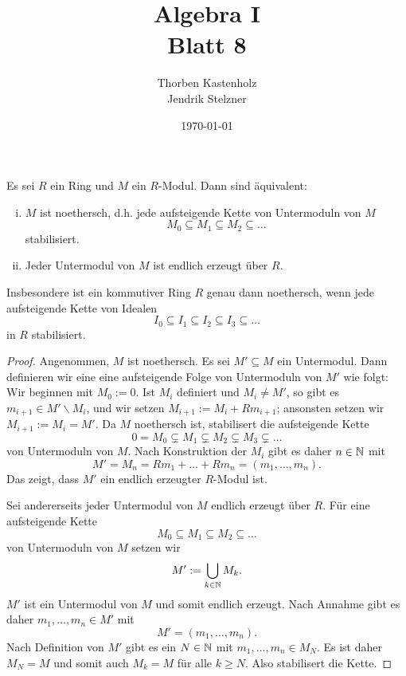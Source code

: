 \documentclass[a4paper,10pt]{article}
\title{\sc Algebra I \\ \Large Blatt 8}
\author{Thorben Kastenholz \\ Jendrik Stelzner}
\date{\today}
\begin{document}
\maketitle

\section{}

\begin{lem}\label{lem: Äquivalente Definitionen von noethersch}
 Es sei $R$ ein Ring und $M$ ein $R$-Modul. Dann sind äquivalent:
 \begin{enumerate}[i)]
  \item $M$ ist noethersch, d.h. jede aufsteigende Kette von Untermoduln von $M$
  \[
   M_0 \subseteq M_1 \subseteq M_2 \subseteq \ldots
  \]
  stabilisiert.
  \item Jeder Untermodul von $M$ ist endlich erzeugt über $R$.
 \end{enumerate}
 Insbesondere ist ein kommutiver Ring $R$ genau dann noethersch, wenn jede aufsteigende Kette von Idealen
 \[
  I_0 \subseteq I_1 \subseteq I_2 \subseteq I_3 \subseteq \ldots
 \]
 in $R$ stabilisiert.
\end{lem}
\begin{proof}
 Angenommen, $M$ ist noethersch. Es sei $M' \subseteq M$ ein Untermodul. Dann definieren wir eine eine aufsteigende Folge von Untermoduln von $M'$ wie folgt: Wir beginnen mit $M_0 := 0$. Ist $M_i$ definiert und $M_i \neq M'$, so gibt es $m_{i+1} \in M' \smallsetminus M_i$, und wir setzen $M_{i+1} := M_i + R m_{i+1}$; ansonsten setzen wir $M_{i+1} := M_i = M'$. Da $M$ noethersch ist, stabilisert die aufsteigende Kette
 \[
  0 = M_0 \subsetneq M_1 \subsetneq M_2 \subsetneq M_3 \subsetneq \ldots
 \]
 von Untermoduln von $M$. Nach Konstruktion der $M_i$ gibt es daher $n \in \mathbb{N}$ mit
 \[
  M' = M_n = Rm_1 + \ldots + Rm_n = (m_1, \ldots, m_n).
 \]
 Das zeigt, dass $M'$ ein endlich erzeugter $R$-Modul ist.
 
 Sei andererseits jeder Untermodul von $M$ endlich erzeugt über $R$. Für eine aufsteigende Kette
 \[
  M_0 \subseteq M_1 \subseteq M_2 \subseteq \ldots
 \]
 von Untermoduln von $M$ setzen wir
 \[
  M' := \bigcup_{k \in \mathbb{N}} M_k.
 \]
 $M'$ ist ein Untermodul von $M$ und somit endlich erzeugt. Nach Annahme gibt es daher $m_1, \ldots, m_n \in M'$ mit
 \[
  M' = (m_1, \ldots, m_n).
 \]
 Nach Definition von $M'$ gibt es ein $N \in \mathbb{N}$ mit $m_1, \ldots, m_n \in M_N$. Es ist daher $M_N = M$ und somit auch $M_k = M$ für alle $k \geq N$. Also stabilisert die Kette.
\end{proof}
\end{document}
